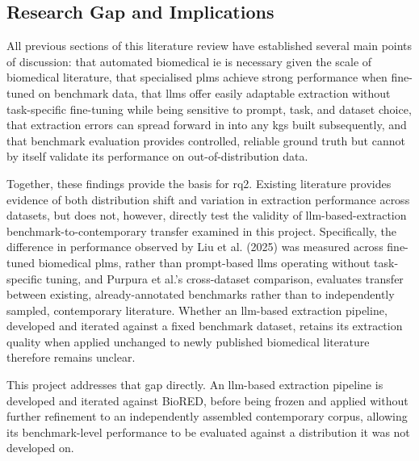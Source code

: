 \subsection{Research Gap and Implications}
\label{subsec:lit:research_gap_and_implications}
All previous sections of this literature review have established several main points of discussion: that automated biomedical \gls{ie} is necessary given the scale of biomedical literature, that specialised \glspl{plm} achieve strong performance when fine-tuned on benchmark data, that \glspl{llm} offer easily adaptable extraction without task-specific fine-tuning while being sensitive to prompt, task, and dataset choice, that extraction errors can spread forward in into any \glspl{kg} built subsequently, and that benchmark evaluation provides controlled, reliable ground truth but cannot by itself validate its performance on out-of-distribution data.

Together, these findings provide the basis for \gls{rq2}. Existing literature provides evidence of both distribution shift and variation in extraction performance across datasets, but does not, however, directly test the validity of \gls{llm}-based-extraction benchmark-to-contemporary transfer examined in this project. Specifically, the difference in performance observed by Liu et al. (2025) was measured across fine-tuned biomedical \glspl{plm}, rather than prompt-based \glspl{llm} operating without task-specific tuning, and Purpura et al.'s cross-dataset comparison, evaluates transfer between existing, already-annotated benchmarks rather than to independently sampled, contemporary literature. Whether an \gls{llm}-based extraction pipeline, developed and iterated against a fixed benchmark dataset, retains its extraction quality when applied unchanged to newly published biomedical literature therefore remains unclear.

This project addresses that gap directly. An \gls{llm}-based extraction pipeline is developed and iterated against BioRED, before being frozen and applied without further refinement to an independently assembled contemporary corpus, allowing its benchmark-level performance to be evaluated against a distribution it was not developed on.